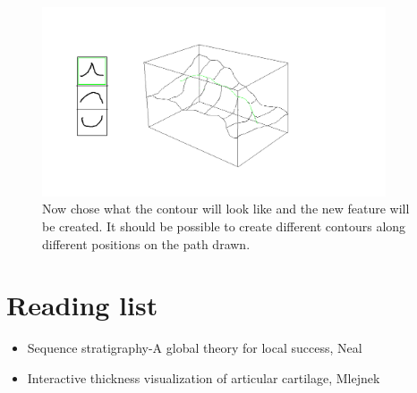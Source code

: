 \documentclass[12pt,a4paper]{article}
\begin{document}
\begin{itemize}
\begin{figure}
\centering
\includegraphics[width=4in]{createRidge1}
\caption[]{
  \footnotesize
  Now chose what the contour will look like and the new feature will be created. It should be possible to create different contours along different positions on the path drawn. 
  \label{fig:createRidge1}
}
\end{figure}

\clearpage

\section*{Reading list}
\begin{itemize}
 \item Sequence stratigraphy-A global theory for local success, Neal
 \item Interactive thickness visualization of articular cartilage, Mlejnek
\end{itemize}
\end{itemize}

\clearpage
\end{document}
